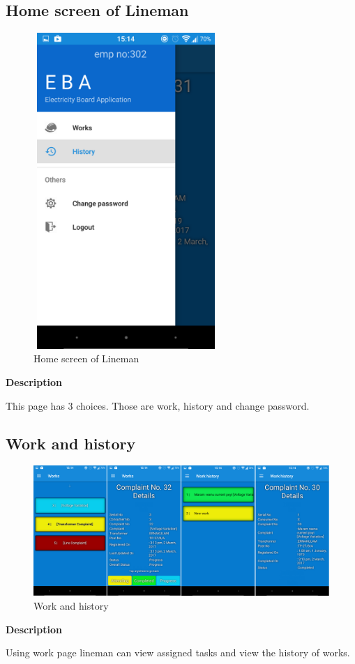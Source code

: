 \documentclass[12pt,a4paper,oneside]{report}
\begin{document}
\newpage
\subsection{Home screen of Lineman}
\begin{figure}[h]
	\begin{center}
		\includegraphics[width=7cm,height=12cm]{sslineman.png}
			\caption{Home screen of Lineman}
			\label{Home screen of Lineman}
	\end{center}
\end{figure}
\textbf{Description}
\par  This page has 3 choices. Those are work, history and change password.

\newpage
\subsection{Work and history}
\begin{figure}[h]
	\begin{center}
		\includegraphics[scale=0.07]{linehome.jpg}
			\caption{Work and history}
			\label{Work and history}
	\end{center}
\end{figure}
\textbf{Description}
\par  Using work page lineman can view assigned tasks and view the history of works.
\end{document}
